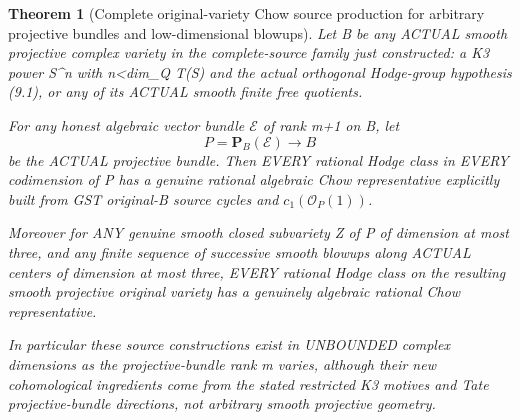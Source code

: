\documentclass[11pt]{article}
\newtheorem{theorem}{Theorem}[section]
\begin{document}
\begin{theorem}[Complete original-variety Chow source production for arbitrary projective bundles and low-dimensional blowups]
Let B be any ACTUAL smooth projective
complex variety in the complete-source
family just constructed: a K3 power
S^n with n<dim_Q T(S) and the
actual orthogonal Hodge-group
hypothesis (9.1), or any of its
ACTUAL smooth finite free quotients.

For any honest algebraic vector
bundle \(\mathcal E\) of rank
m+1 on B, let
\[
 \boxed{P=\mathbf P_B(\mathcal E)\to B}
                                                               \tag{10.1}
\]
be the ACTUAL projective bundle.
Then EVERY rational Hodge class in
EVERY codimension of P has a
genuine rational algebraic Chow
representative explicitly built
from GST original-B source cycles
and \(c_1(\mathcal O_P(1))\).

Moreover for ANY genuine smooth
closed subvariety Z of P of
dimension at most three, and any
finite sequence of successive
smooth blowups along ACTUAL
centers of dimension at most
three, EVERY rational Hodge
class on the resulting smooth
projective original variety has
a genuinely algebraic rational
Chow representative.

In particular these source
constructions exist in
UNBOUNDED complex dimensions
as the projective-bundle rank m
varies, although their
new cohomological ingredients
come from the stated
restricted K3 motives and Tate
projective-bundle directions,
not arbitrary smooth projective
geometry.
\end{theorem}
\end{document}
